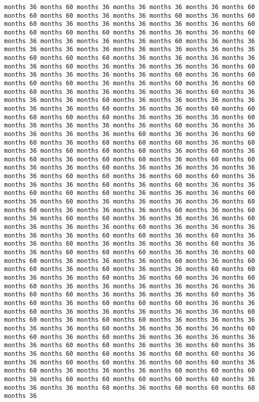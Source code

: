 \documentclass[11pt]{article}
\begin{document}
\begin{Verbatim}[commandchars=\\\{\}, frame=single, framerule=2mm, rulecolor=\color{outerrorbackground}]
months 36 months 60 months 36 months 36 months 36 months 36 months 60 months 60 months 60 months 36 months 36 months 60 months 36 months 60 months 60 months 36 months 36 months 36 months 36 months 36 months 60 months 60 months 60 months 60 months 36 months 36 months 36 months 60 months 36 months 36 months 36 months 36 months 60 months 36 months 36 months 36 months 36 months 36 months 36 months 36 months 36 months 36 months 60 months 60 months 60 months 36 months 36 months 36 months 36 months 36 months 60 months 36 months 36 months 36 months 36 months 60 months 36 months 36 months 36 months 36 months 60 months 36 months 60 months 60 months 60 months 36 months 36 months 60 months 36 months 60 months 60 months 36 months 36 months 36 months 36 months 60 months 36 months 36 months 36 months 60 months 36 months 36 months 36 months 36 months 36 months 36 months 60 months 36 months 36 months 60 months 60 months 60 months 60 months 60 months 36 months 36 months 36 months 60 months 36 months 36 months 36 months 36 months 60 months 36 months 36 months 36 months 36 months 36 months 60 months 36 months 36 months 60 months 60 months 36 months 60 months 60 months 60 months 36 months 60 months 36 months 60 months 60 months 60 months 36 months 60 months 36 months 60 months 36 months 60 months 60 months 36 months 60 months 60 months 36 months 36 months 60 months 36 months 36 months 36 months 36 months 36 months 60 months 60 months 36 months 60 months 60 months 36 months 36 months 36 months 60 months 36 months 60 months 36 months 36 months 60 months 60 months 60 months 36 months 36 months 36 months 60 months 36 months 60 months 36 months 36 months 36 months 36 months 60 months 60 months 36 months 36 months 36 months 60 months 36 months 60 months 36 months 60 months 60 months 36 months 36 months 36 months 60 months 36 months 36 months 36 months 60 months 36 months 36 months 36 months 36 months 36 months 60 months 60 months 36 months 60 months 36 months 36 months 60 months 36 months 36 months 36 months 60 months 36 months 36 months 60 months 60 months 60 months 36 months 36 months 60 months 60 months 36 months 36 months 36 months 60 months 36 months 60 months 60 months 36 months 60 months 36 months 36 months 60 months 60 months 36 months 36 months 60 months 36 months 60 months 36 months 60 months 60 months 36 months 36 months 36 months 36 months 36 months 36 months 60 months 60 months 36 months 36 months 36 months 60 months 36 months 60 months 36 months 60 months 60 months 60 months 36 months 36 months 60 months 36 months 36 months 36 months 36 months 36 months 60 months 60 months 36 months 60 months 60 months 36 months 36 months 36 months 36 months 36 months 60 months 36 months 36 months 36 months 60 months 60 months 36 months 60 months 36 months 36 months 36 months 36 months 36 months 60 months 60 months 36 months 36 months 60 months 36 months 36 months 60 months 60 months 36 months 60 months 60 months 36 months 36 months 60 months 60 months 36 months 60 months 60 months 36 months 60 months 36 months 36 months 36 months 60 months 60 months 60 months 36 months 60 months 60 months 60 months 60 months 60 months 36 months 36 months 36 months 60 months 36 months 60 months 60 months 60 months 36 
\end{Verbatim}
\end{document}
